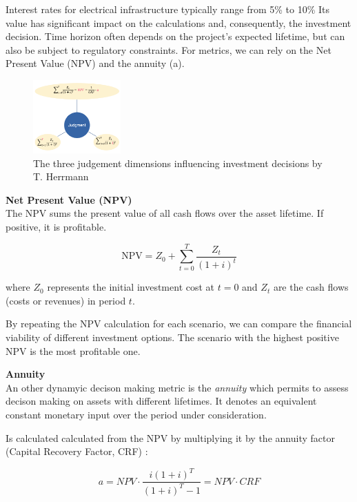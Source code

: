 Interest rates for electrical infrastructure typically range from 5\% to 10\% \cite{irena2023costs} Its value has 
significant impact on the calculations and, consequently, the investment decision. Time horizon often depends
on the project's expected lifetime, but can also be subject to regulatory constraints. For metrics, we can rely on 
the Net Present Value (NPV) and the annuity (a).

\begin{figure}[h!]
    \centering
    \includegraphics[width=0.3\textwidth]{images/investment-decision.png}
    \caption{The three judgement dimensions influencing investment decisions by T. Herrmann}
    \label{fig:investment_decision}
\end{figure}

\textbf{Net Present Value (NPV)} \\
The NPV sums the present value of all cash flows over the asset lifetime. If positive, it is profitable.

\begin{equation}
\label{eq:npv_equation}
\text{NPV} = Z_0 + \sum_{t=0}^{T} \frac{Z_t}{(1 + i)^t}
\end{equation}

\noindent
where $Z_0$ represents the initial investment cost at $t=0$ and $Z_t$ are the cash flows (costs or revenues) 
in period $t$.

By repeating the NPV calculation for each scenario, we can compare the financial viability of different 
investment options. The scenario with the highest positive NPV is the most profitable one.

\textbf{Annuity} \\
An other dynamyic decison making metric is the \emph{annuity} which permits to assess decison making on assets
with different lifetimes. It denotes an equivalent constant monetary input over the period under consideration.

Is calculated calculated from the NPV by multiplying it by the annuity factor (Capital Recovery Factor, CRF) :

\begin{equation}
\label{eq:annuity_equation}
a = NPV \cdot \frac{i (1 + i)^T}{(1 + i)^T - 1} = NPV \cdot CRF
\end{equation}

